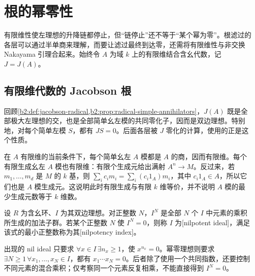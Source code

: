 
\section{根的幂零性}
\label{b2:sec:1501}

有限维性使左理想的升降链都停止，但“链停止”还不等于“某个幂为零”。根滤过的各层可以通过半单商来理解，而要让滤过最终到达零，还需将有限维性与非交换 Nakayama 引理合起来。始终令 \(A\) 为域 \(k\) 上的有限维结合含幺代数，记 \(J=J(A)\)。

%
%

\subsection{有限维代数的 Jacobson 根}
\label{b2:subsec:1501:01}

回顾\cref{b2:def:jacobson-radical,b2:prop:radical-simple-annihilators}，\(J(A)\) 既是全部极大左理想的交，也是全部简单幺左模的共同零化子，因而是双边理想。特别地，对每个简单左模 \(S\)，都有 \(JS=0\)。后面各层被 \(J\) 零化的计算，使用的正是这个性质。

\ProseParagraphBreak
在 \(A\) 有限维的当前条件下，每个简单幺左 \(A\) 模都是 \(A\) 的商，因而有限维。每个有限生成幺左 \(A\) 模也有限维：有限个生成元给出满射 \(A^n\to M\)。反过来，若 \(m_1,\ldots,m_d\) 是 \(M\) 的 \(k\) 基，则 \(\sum_i c_im_i=\sum_i(c_i1_A)m_i\)，其中 \(c_i1_A\in A\)，所以它们也是 \(A\) 模生成元。这说明此时有限生成与有限 \(k\) 维等价，并不说明 \(A\) 模的最少生成元数等于 \(k\) 维数。

\begin{definition}\label{b2:def:nilpotent-ideal}
	设 \(R\) 为含幺环、\(I\) 为其双边理想。对正整数 \(N\)，\(I^N\) 是全部 \(N\) 个 \(I\) 中元素的乘积所生成的加法子群。若某个正整数 \(N\) 使 \(I^N=0\)，则称 \(I\) 为[nilpotent ideal]，满足该式的最小正整数称为其[nilpotency index]。
\end{definition}

出现的 nil ideal 只要求 \(\forall x\in I\,\exists n_x\ge1\)，使 \(x^{n_x}=0\)。幂零理想则要求 \(\exists N\ge1\,\forall x_1,\ldots,x_N\in I\)，都有 \(x_1\cdots x_N=0\)。后者除了使用一个共同指数，还要控制不同元素的混合乘积；仅考察同一个元素反复相乘，不能直接得到 \(I^N=0\)。

